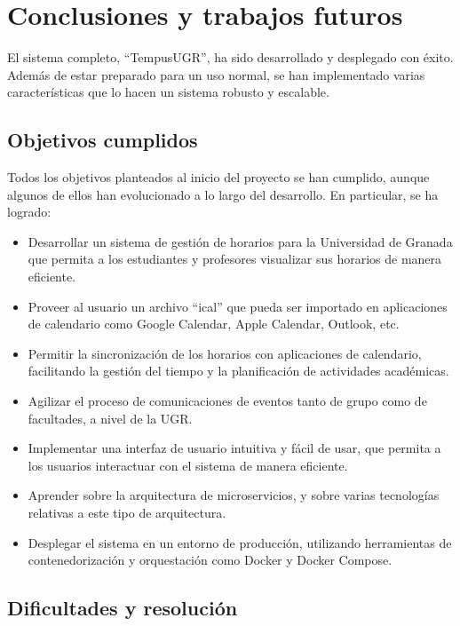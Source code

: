 \chapter{Conclusiones y trabajos futuros}\label{cap:conclusiones}


El sistema completo, ``TempusUGR'', ha sido desarrollado y desplegado con éxito. Además de estar preparado para un uso normal, se han implementado varias características que lo hacen un sistema robusto y escalable. 

\section{Objetivos cumplidos}
Todos los objetivos planteados al inicio del proyecto se han cumplido, aunque algunos de ellos han evolucionado a lo largo del desarrollo. En particular, se ha logrado:
\begin{itemize}
    \item Desarrollar un sistema de gestión de horarios para la Universidad de Granada que permita a los estudiantes y profesores visualizar sus horarios de manera eficiente.
    \item Proveer al usuario un archivo ``ical'' que pueda ser importado en aplicaciones de calendario como Google Calendar, Apple Calendar, Outlook, etc.
    \item Permitir la sincronización de los horarios con aplicaciones de calendario, facilitando la gestión del tiempo y la planificación de actividades académicas.
    \item Agilizar el proceso de comunicaciones de eventos tanto de grupo como de facultades, a nivel de la UGR.
    \item Implementar una interfaz de usuario intuitiva y fácil de usar, que permita a los usuarios interactuar con el sistema de manera eficiente.
    \item Aprender sobre la arquitectura de microservicios, y sobre varias tecnologías relativas a este tipo de arquitectura.
    \item Desplegar el sistema en un entorno de producción, utilizando herramientas de contenedorización y orquestación como Docker y Docker Compose.
\end{itemize}

\section{Dificultades y resolución}

